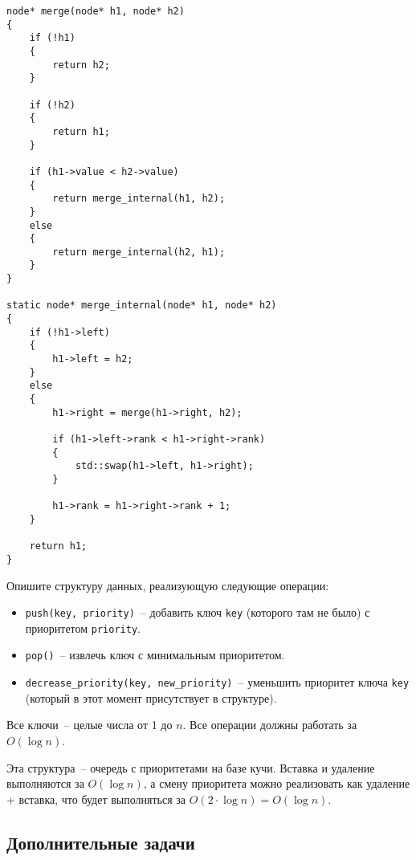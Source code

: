 \begin{solution}
    \medskip\noindent

    \begin{lstlisting}
node* merge(node* h1, node* h2)
{
    if (!h1)
    {
        return h2;
    }

    if (!h2)
    {
        return h1;
    }

    if (h1->value < h2->value)
    {
        return merge_internal(h1, h2);
    }
    else
    {
        return merge_internal(h2, h1);
    }
}

static node* merge_internal(node* h1, node* h2)
{
    if (!h1->left)
    {
        h1->left = h2;
    }
    else
    {
        h1->right = merge(h1->right, h2);

        if (h1->left->rank < h1->right->rank)
        {
            std::swap(h1->left, h1->right);
        }

        h1->rank = h1->right->rank + 1;
    }

    return h1;
}
    \end{lstlisting}
\end{solution}


\begin{problem}
    Опишите структуру данных, реализующую следующие операции:
    \begin{itemize}
        \item \texttt{push(key, priority)}~-- добавить ключ \texttt{key} (которого там не было) с приоритетом \texttt{priority}.
        \item \texttt{pop()}~-- извлечь ключ с минимальным приоритетом.
        \item \texttt{decrease\_priority(key, new\_priority)}~-- уменьшить приоритет ключа \texttt{key} (который в этот момент присутствует в структуре).
    \end{itemize}
    Все ключи~-- целые числа от 1 до $n$. Все операции должны работать за $O(\log{n})$.
\end{problem}

\begin{solution}
    \medskip\noindent

    Эта структура~-- очередь с приоритетами на базе кучи.
    Вставка и удаление выполняются за $O(\log{n})$, а смену приоритета можно реализовать как удаление + вставка,
    что будет выполняться за $O(2\cdot\log{n}) = O(\log{n})$.
\end{solution}


\subsection*{Дополнительные задачи}

